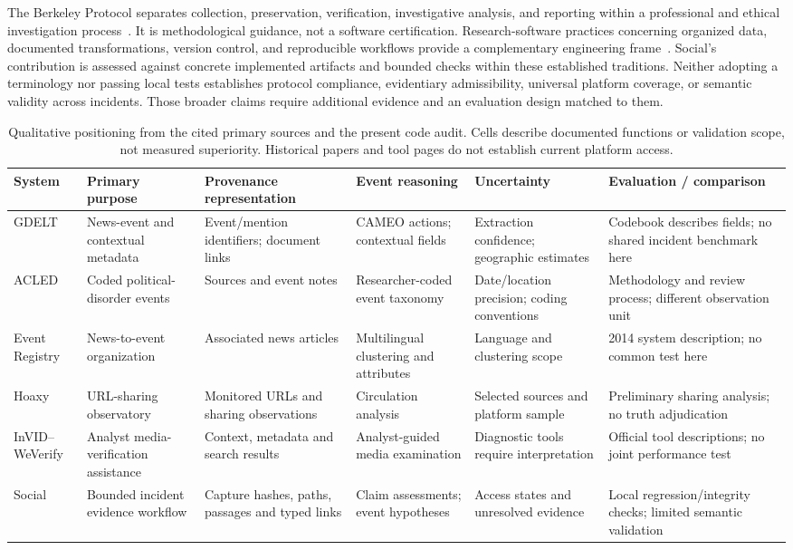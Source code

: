 The Berkeley Protocol separates collection, preservation, verification,
investigative analysis, and reporting within a professional and ethical
investigation process~\cite{berkeleyProtocol2022}. It is methodological guidance,
not a software certification. Research-software practices concerning organized
data, documented transformations, version control, and reproducible workflows
provide a complementary engineering frame~\cite{wilson2017practices}. Social's
contribution is assessed against concrete implemented artifacts and bounded
checks within these established traditions. Neither adopting a terminology nor
passing local tests establishes protocol compliance, evidentiary admissibility,
universal platform coverage, or semantic validity across incidents. Those broader
claims require additional evidence and an evaluation design matched to them.

\begin{table}[t]
\centering
\footnotesize
\setlength{\tabcolsep}{3pt}
\renewcommand{\arraystretch}{1.12}
\caption{Qualitative positioning from the cited primary sources and the present
code audit. Cells describe documented functions or validation scope, not measured
superiority. Historical papers and tool pages do not establish current platform
access.}
\label{tab:related}
\begin{tabularx}{\textwidth}{@{}p{20mm}YYYYY@{}}
\toprule
System & Primary purpose & Provenance representation & Event reasoning & Uncertainty & Evaluation / comparison \\
\midrule
GDELT & News-event and contextual metadata & Event/mention identifiers; document links & CAMEO actions; contextual fields & Extraction confidence; geographic estimates & Codebook describes fields; no shared incident benchmark here \\
ACLED & Coded political-disorder events & Sources and event notes & Researcher-coded event taxonomy & Date/location precision; coding conventions & Methodology and review process; different observation unit \\
Event Registry & News-to-event organization & Associated news articles & Multilingual clustering and attributes & Language and clustering scope & 2014 system description; no common test here \\
Hoaxy & URL-sharing observatory & Monitored URLs and sharing observations & Circulation analysis & Selected sources and platform sample & Preliminary sharing analysis; no truth adjudication \\
InVID--WeVerify & Analyst media-verification assistance & Context, metadata and search results & Analyst-guided media examination & Diagnostic tools require interpretation & Official tool descriptions; no joint performance test \\
Social & Bounded incident evidence workflow & Capture hashes, paths, passages and typed links & Claim assessments; event hypotheses & Access states and unresolved evidence & Local regression/integrity checks; limited semantic validation \\
\bottomrule
\end{tabularx}
\end{table}
